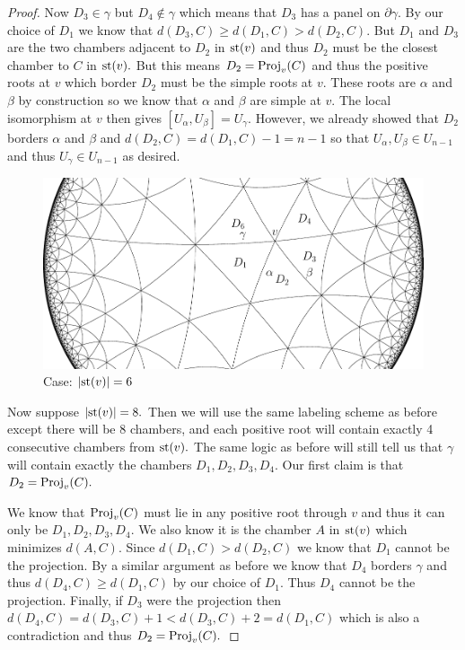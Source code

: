 \documentclass[class=book, crop=false]{standalone}
\begin{document}
\begin{proof}
	Now $D_3\in \gamma$ but $D_4\not\in \gamma$ which means that $D_3$ has a panel on $\partial\gamma.$ By our choice of $D_1$ we know that $d(D_3,C)\ge d(D_1,C)>d(D_2,C).$ But $D_1$ and $D_3$ are the two chambers adjacent to $D_2$ in $\mathrm{st}(v)$ and thus $D_2$ must be the closest chamber to $C$ in $\mathrm{st}(v).$ But this means $D_2=\mathrm{Proj}_v(C)$ and thus the positive roots at $v$ which border $D_2$ must be the simple roots at $v.$ These roots are $\alpha$ and $\beta$ by construction so we know that $\alpha$ and $\beta$ are simple at $v.$  The local isomorphism at $v$ then gives $[U_\alpha,U_\beta]=U_\gamma.$ However, we already showed that $D_2$ borders $\alpha$ and $\beta$ and $d(D_2,C)=d(D_1,C)-1=n-1$ so that $U_\alpha,U_\beta\in U_{n-1}$ and thus $U_\gamma\in U_{n-1}$ as desired.\\
	\begin{figure}
		\label{deg6433f2}
		\includegraphics{diagrams/deg6433f2.pdf}
		\caption{Case: $|\mathrm{st}(v)|=6$}
	\end{figure}


	Now suppose $|\mathrm{st}(v)|=8.$ Then we will use the same labeling scheme as before except there will be $8$ chambers, and each positive root will contain exactly 4 consecutive chambers from $\mathrm{st}(v).$ The same logic as before will still tell us that $\gamma$ will contain exactly the chambers $D_1,D_2,D_3,D_4.$ Our first claim is that $D_2=\mathrm{Proj}_v(C).$

	We know that $\mathrm{Proj}_v(C)$ must lie in any positive root through $v$ and thus it can only be $D_1,D_2,D_3,D_4.$ We also know it is the chamber $A$ in $\mathrm{st}(v)$ which minimizes $d(A,C).$ Since $d(D_1,C)>d(D_2,C)$ we know that $D_1$ cannot be the projection. By a similar argument as before we know that $D_4$ borders $\gamma$ and thus $d(D_4,C)\ge d(D_1,C)$ by our choice of $D_1.$ Thus $D_4$ cannot be the projection. Finally, if $D_3$ were the projection then $d(D_4,C)=d(D_3,C)+1<d(D_3,C)+2=d(D_1,C)$ which is also a contradiction and thus $D_2=\mathrm{Proj}_v(C).$


\end{proof}
\end{document}
